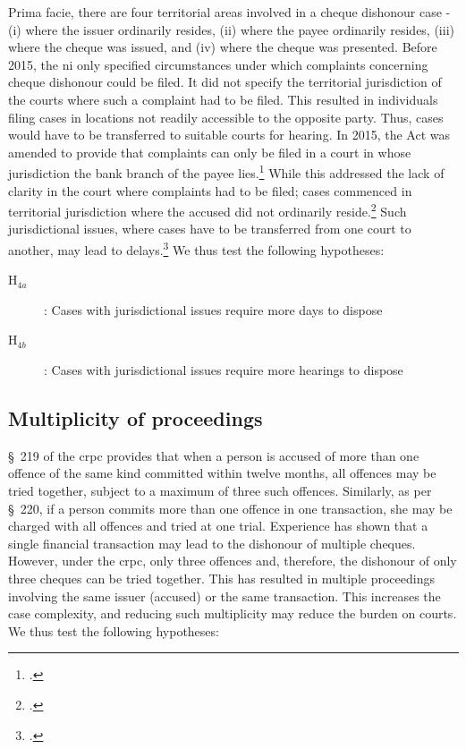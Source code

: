 \documentclass[12pt,a4paper]{article}
\begin{document}
Prima facie, there are four territorial areas involved in a cheque dishonour case - (i) where the issuer ordinarily resides, (ii) where the payee ordinarily resides, (iii) where the cheque was issued, and (iv) where the cheque was presented. Before 2015, the \gls{ni} only specified circumstances under which complaints concerning cheque dishonour could be filed. It did not specify the territorial jurisdiction of the courts where such a complaint had to be filed. This resulted in individuals filing cases in locations not readily accessible to the opposite party. Thus, cases would have to be transferred to suitable courts for hearing. In 2015, the Act was amended to provide that complaints can only be filed in a court in whose jurisdiction the bank branch of the payee lies.\footcite{niAmend2015} While this addressed the lack of clarity in the court where complaints had to be filed; cases commenced in territorial jurisdiction where the accused did not ordinarily reside.\footcite{amicus2020_submission} Such jurisdictional issues, where cases have to be transferred from one court to another, may lead to delays.\footcite{sc2020_138, amicus2020_submission} We thus test the following hypotheses:

\begin{description}
\item[H$_{4a}$]: Cases with jurisdictional issues require more days to dispose
\item[H$_{4b}$]: Cases with jurisdictional issues require more hearings to dispose
\end{description}

\subsection{Multiplicity of proceedings}

\S~219 of the \gls{crpc} provides that when a person is accused of more than one offence of the same kind committed within twelve months, all offences may be tried together, subject to a maximum of three such offences. Similarly, as per \S~220, if a person commits more than one offence in one transaction, she may be charged with all offences and tried at one trial. Experience has shown that a single financial transaction may lead to the dishonour of multiple cheques. However, under the \gls{crpc}, only three offences and, therefore, the dishonour of only three cheques can be tried together. This has resulted in multiple proceedings involving the same issuer (accused) or the same transaction. This increases the case complexity, and reducing such multiplicity may reduce the burden on courts. We thus test the following hypotheses:
\end{document}
